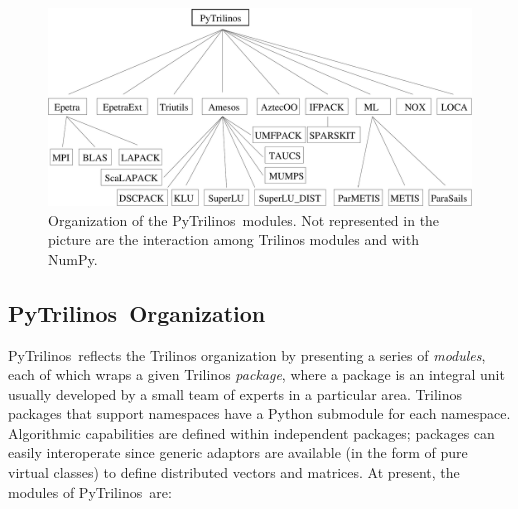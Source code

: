 \documentclass[acmtocl]{acmtrans2m}
\newcommand{\PyTrilinos}{{PyTrilinos}}
\begin{document}
\begin{figure}
  \begin{center}
    \includegraphics[width=12cm]{organization}
    \caption{Organization of the \PyTrilinos\ modules.  Not represented
      in the picture are the interaction among Trilinos modules and
      with NumPy.}
    \label{fig:organization}
  \end{center}
\end{figure}

\subsection{\PyTrilinos\ Organization}
\label{sec:organization}

\PyTrilinos\ reflects the Trilinos organization by presenting a series
of {\sl modules}, each of which wraps a given Trilinos {\sl package},
where a package is an integral unit usually developed by a small team
of experts in a particular area.  Trilinos packages that support
namespaces have a Python submodule for each namespace.  Algorithmic
capabilities are defined within independent packages; packages can
easily interoperate since generic adaptors are available (in the form
of pure virtual classes) to define distributed vectors and matrices.
At present, the modules of \PyTrilinos\ are:
\end{document}
